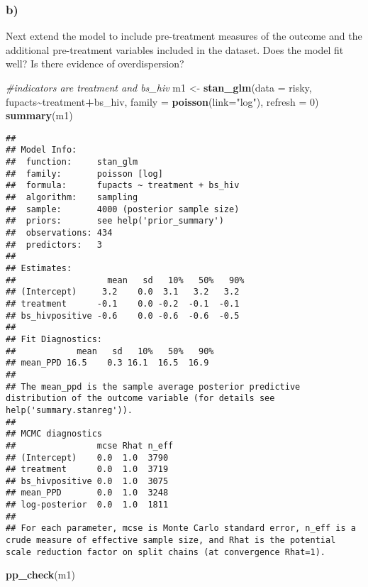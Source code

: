 \documentclass[
]{article}
\newenvironment{Shaded}{\begin{snugshade}}{\end{snugshade}}
\newcommand{\AttributeTok}[1]{\textcolor[rgb]{0.13,0.29,0.53}{#1}}
\newcommand{\CommentTok}[1]{\textcolor[rgb]{0.56,0.35,0.01}{\textit{#1}}}
\newcommand{\DecValTok}[1]{\textcolor[rgb]{0.00,0.00,0.81}{#1}}
\newcommand{\FunctionTok}[1]{\textcolor[rgb]{0.13,0.29,0.53}{\textbf{#1}}}
\newcommand{\NormalTok}[1]{#1}
\newcommand{\OtherTok}[1]{\textcolor[rgb]{0.56,0.35,0.01}{#1}}
\newcommand{\SpecialCharTok}[1]{\textcolor[rgb]{0.81,0.36,0.00}{\textbf{#1}}}
\newcommand{\StringTok}[1]{\textcolor[rgb]{0.31,0.60,0.02}{#1}}
\begin{document}
\hypertarget{b}{%
\subsubsection{b)}\label{b}}

Next extend the model to include pre-treatment measures of the outcome
and the additional pre-treatment variables included in the dataset. Does
the model fit well? Is there evidence of overdispersion?

\begin{Shaded}
\begin{Highlighting}[]
\CommentTok{\#indicators are treatment and bs\_hiv}
\NormalTok{m1 }\OtherTok{\textless{}{-}} \FunctionTok{stan\_glm}\NormalTok{(}\AttributeTok{data =}\NormalTok{ risky, fupacts}\SpecialCharTok{\textasciitilde{}}\NormalTok{treatment}\SpecialCharTok{+}\NormalTok{bs\_hiv, }\AttributeTok{family =} \FunctionTok{poisson}\NormalTok{(}\AttributeTok{link=}\StringTok{"log"}\NormalTok{), }\AttributeTok{refresh =} \DecValTok{0}\NormalTok{)}
\FunctionTok{summary}\NormalTok{(m1)}
\end{Highlighting}
\end{Shaded}

\begin{verbatim}
## 
## Model Info:
##  function:     stan_glm
##  family:       poisson [log]
##  formula:      fupacts ~ treatment + bs_hiv
##  algorithm:    sampling
##  sample:       4000 (posterior sample size)
##  priors:       see help('prior_summary')
##  observations: 434
##  predictors:   3
## 
## Estimates:
##                  mean   sd   10%   50%   90%
## (Intercept)     3.2    0.0  3.1   3.2   3.2 
## treatment      -0.1    0.0 -0.2  -0.1  -0.1 
## bs_hivpositive -0.6    0.0 -0.6  -0.6  -0.5 
## 
## Fit Diagnostics:
##            mean   sd   10%   50%   90%
## mean_PPD 16.5    0.3 16.1  16.5  16.9 
## 
## The mean_ppd is the sample average posterior predictive distribution of the outcome variable (for details see help('summary.stanreg')).
## 
## MCMC diagnostics
##                mcse Rhat n_eff
## (Intercept)    0.0  1.0  3790 
## treatment      0.0  1.0  3719 
## bs_hivpositive 0.0  1.0  3075 
## mean_PPD       0.0  1.0  3248 
## log-posterior  0.0  1.0  1811 
## 
## For each parameter, mcse is Monte Carlo standard error, n_eff is a crude measure of effective sample size, and Rhat is the potential scale reduction factor on split chains (at convergence Rhat=1).
\end{verbatim}

\begin{Shaded}
\begin{Highlighting}[]
\FunctionTok{pp\_check}\NormalTok{(m1)}
\end{Highlighting}
\end{Shaded}
\end{document}
